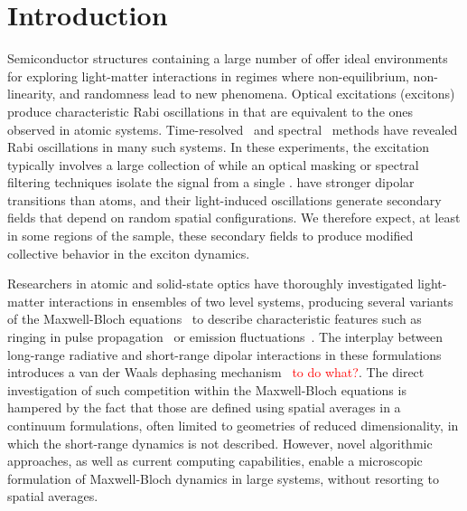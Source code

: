 \section{\label{section:introduction}Introduction}
Semiconductor structures containing a large number of \qds{} offer ideal environments for exploring light-matter interactions in regimes where non-equilibrium, non-linearity, and randomness lead to new phenomena.
Optical excitations (excitons) produce characteristic Rabi oscillations in \qds{} that are equivalent to the ones observed in atomic systems.
Time-resolved~\cite{Stievater2001,shih} and spectral~\cite{kamada} methods have revealed Rabi oscillations in many such systems.
In these experiments, the excitation typically involves a large collection of \qds{} while an optical masking or spectral filtering techniques isolate the signal from a single \qd{}.
\Qds{} have stronger dipolar transitions than atoms, and their light-induced oscillations generate secondary fields that depend on random spatial configurations.
We therefore expect, at least in some regions of the sample, these secondary fields to produce modified collective behavior in the exciton dynamics.

Researchers in atomic and solid-state optics have thoroughly investigated light-matter interactions in ensembles of two level systems, producing several variants of the Maxwell-Bloch equations~\cite{Gross1982} to describe characteristic features such as ringing in pulse propagation~\cite{Burnham1969,MacGillivray1976} or emission fluctuations~\cite{Haake1979}.
The interplay between long-range radiative and short-range dipolar interactions in these formulations introduces a van der Waals dephasing mechanism~\cite{Coffey1978} \textcolor{red}{to do what?}.
The direct investigation of such competition within the Maxwell-Bloch equations is hampered by the fact that those are defined using spatial averages in a continuum formulations, often limited to geometries of reduced dimensionality, in which the short-range dynamics is not described.
However, novel algorithmic approaches, as well as current computing capabilities, enable a microscopic formulation of Maxwell-Bloch dynamics in large systems, without resorting to spatial averages.

